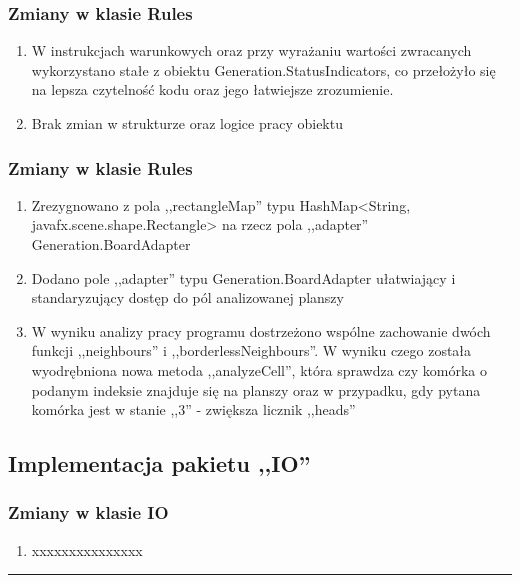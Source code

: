 \documentclass[a4paper,11pt]{article}
\newcommand{\linia}{\rule{\linewidth}{0.4mm}}
\begin{document}
\subsubsection{Zmiany w klasie Rules}
\begin{enumerate}
\item W instrukcjach warunkowych oraz przy wyrażaniu wartości zwracanych wykorzystano stałe z obiektu Generation.StatusIndicators, co przełożyło się na lepsza czytelność kodu oraz jego łatwiejsze zrozumienie.
\item Brak zmian w strukturze oraz logice pracy obiektu
\end{enumerate}
\subsubsection{Zmiany w klasie Rules}
\begin{enumerate}
\item Zrezygnowano z pola ,,rectangleMap'' typu HashMap<String, javafx.scene.shape.Rectangle> na rzecz pola ,,adapter'' Generation.BoardAdapter
\item Dodano pole ,,adapter'' typu Generation.BoardAdapter ułatwiający i standaryzujący dostęp do pól analizowanej planszy
\item W wyniku analizy pracy programu dostrzeżono wspólne zachowanie dwóch funkcji ,,neighbours'' i ,,borderlessNeighbours''. W wyniku czego została wyodrębniona nowa metoda ,,analyzeCell'', która sprawdza czy komórka o podanym indeksie znajduje się na planszy oraz w przypadku, gdy pytana komórka jest w stanie ,,3'' - zwiększa licznik ,,heads''
\end{enumerate}

\subsection{Implementacja pakietu ,,IO''}
\subsubsection{Zmiany w klasie IO}
\begin{enumerate}
\item xxxxxxxxxxxxxxx
\end{enumerate}


\noindent\linia
\end{document}
